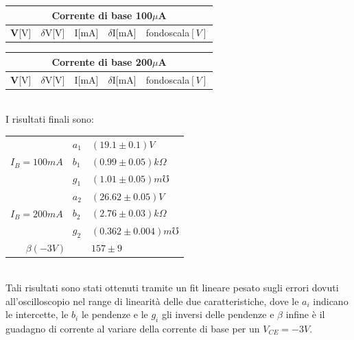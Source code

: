 \documentclass{amsart}
\begin{document}
    \begin{center}
        \begin{tabular}{|p{1cm}|p{1cm}|p{1cm}|p{1cm}|p{2cm}|}
            \hline
            \multicolumn{5}{|c|}{Corrente di base 100$\mu$A}\\
            \hline
            \textbf V[V] & $\delta$V[V] & I[mA] & $\delta$I[mA] & fondoscala$[V]$ \\
            \hline
            
            \hline      
        \end{tabular}
        \hspace{1cm}
        \begin{tabular}{|p{1cm}|p{1cm}|p{1cm}|p{1cm}|p{2cm}|}
            \hline
            \multicolumn{5}{|c|}{Corrente di base 200$\mu$A}\\
            \hline
            \textbf V[V] & $\delta$V[V] & I[mA] & $\delta$I[mA]  & fondoscala$[V]$ \\
            \hline
            
            \hline
        \end{tabular}
    \end{center}
    \hfill \\
    I risultati finali sono:\\
    \begin{center}
        \begin{tabular}{|p{2cm}|p{1cm}|p{3cm}|}
            \hline
            \multirow{3}{*}{$I_B = 100mA$} & $a_1$ & $(19.1 \pm 0.1)V$ \\
                                        & $b_1$ & $(0.99 \pm 0.05) k \Omega$\\
                                        & $g_1$ & $(1.01 \pm 0.05) m \mho $\\
            \hline
            \multirow{3}{*}{$I_B = 200mA$} & $a_2$ & $(26.62 \pm 0.05)V$ \\
                                        & $b_2$ & $(2.76 \pm 0.03) k \Omega$\\
                                        & $g_2$ & $(0.362 \pm 0.004) m \mho $ \\
            \hline
            \multicolumn{2}{|c|}{$\beta(-3V)$} & $157\pm9$ \\
            \hline
        \end{tabular}
    \end{center}
    \hfill \\
    Tali risultati sono stati ottenuti tramite un fit lineare pesato sugli errori dovuti all'oscilloscopio nel range di linearità delle due caratteristiche,
    dove le $a_i$ indicano le intercette, le $b_i$ le pendenze e le $g_i$ gli inversi delle pendenze e $\beta$ infine è il guadagno di corrente al variare
    della corrente di base per un $V_{CE} = -3V$.
\end{document}
